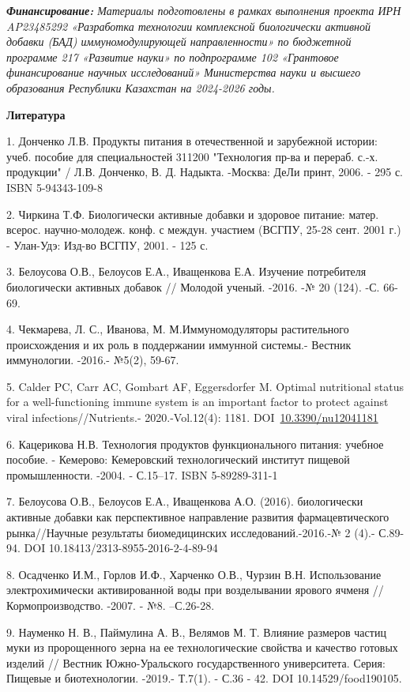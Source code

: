 \emph{{\bfseries Финансирование:} Материалы подготовлены в рамках
выполнения проекта ИРН AP23485292 «Разработка технологии комплексной
биологически активной добавки (БАД) иммуномодулирующей направленности»
по бюджетной программе 217 «Развитие науки» по подпрограмме 102
«Грантовое финансирование научных исследований» Министерства науки и
высшего образования Республики Казахстан на 2024-2026 годы.}

{\bfseries Литература}

1. Донченко Л.В. Продукты питания в отечественной и зарубежной истории:
учеб. пособие для специальностей 311200 "Технология пр-ва и перераб.
с.-х. продукции" / Л.В. Донченко, В. Д. Надыкта. -Москва: ДеЛи принт,
2006. - 295 с. ISBN 5-94343-109-8

2. Чиркина Т.Ф. Биологически активные добавки и здоровое питание: матер.
всерос. научно-молодеж. конф. с междун. участием (ВСГПУ, 25-28 сент.
2001 г.) - Улан-Удэ: Изд-во ВСГПУ, 2001. - 125 с.

3. Белоусова О.В., Белоусов Е.А., Иващенкова Е.А. Изучение потребителя
биологически активных добавок // Молодой ученый. -2016. -№ 20 (124). -С.
66-69.

4. Чекмарева, Л. С., Иванова, М. М.Иммуномодуляторы растительного
происхождения и их роль в поддержании иммунной системы.- Вестник
иммунологии. -2016.- №5(2), 59-67.

5. Calder PC, Carr AC, Gombart AF, Eggersdorfer M. Optimal nutritional
status for a well-functioning immune system is an important factor to
protect against viral infections//Nutrients.- 2020.-Vol.12(4): 1181.
DOI~\href{https://doi.org/10.3390/nu12041181}{10.3390/nu12041181}

6. Кацерикова Н.В. Технология продуктов функционального питания: учебное
пособие. - Кемерово: Кемеровский технологический институт пищевой
промышленности. -2004. - С.15--17. ISBN 5-89289-311-1

7. Белоусова О.В., Белоусов Е.А., Иващенкова А.О. (2016). биологически
активные добавки как перспективное направление развития
фармацевтического рынка//Научные результаты биомедицинских
исследований.-2016.-№ 2 (4).- С.89-94. DOI
10.18413/2313-8955-2016-2-4-89-94

8. Осадченко И.М., Горлов И.Ф., Харченко О.В., Чурзин В.Н. Использование
электрохимически активированной воды при возделывании ярового ячменя
//Кормопроизводство. -2007. - №8. --С.26-28.

9. Науменко Н. В., Паймулина А. В., Велямов М. Т. Влияние размеров частиц
муки из пророщенного зерна на ее технологические свойства и качество
готовых изделий // Вестник Южно-Уральского государственного
университета. Серия: Пищевые и биотехнологии. -2019.- Т.7(1). - С.36 -
42. DOI 10.14529/food190105.

